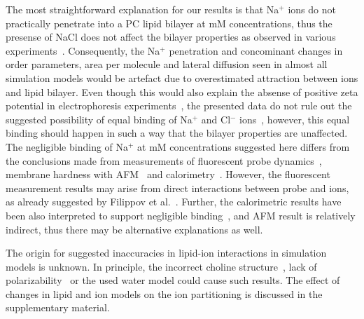 \documentclass[pre,aps,floatfix,authordate1-4,twocolumn]{revtex4-1}
\begin{document}
The most straightforward explanation for our results is that Na$^+$ ions do not practically penetrate into a PC lipid bilayer
at mM concentrations, thus the presense of NaCl does not affect the bilayer properties as observed in various 
experiments~\cite{akutsu81,altenbach84,clarke99,binder02,pabst07,filippov09}.
Consequently, the Na$^+$ penetration and concominant changes in order parameters, area per molecule and lateral diffusion 
seen in almost all simulation models would be artefact due to overestimated attraction between ions and lipid bilayer.
Even though this would also explain the absense of positive zeta potential in electrophoresis 
experiments~\cite{eisenberg79,tatulian87,manyes05,manyes06,klasczyk10},  
the presented data do not rule out the suggested possibility of equal binding of Na$^+$ and Cl$^-$ ions~\cite{knecht13},
however, this equal binding should happen in such a way that the bilayer properties are unaffected.
The negligible binding of Na$^+$ at mM concentrations suggested here differs from the conclusions made from 
measurements of fluorescent probe dynamics~\cite{bockmann03,vacha09a,harb13}, membrane hardness with 
AFM~\cite{manyes05,manyes06,fukuma07,ferber11,morata12} and calorimetry~\cite{bockmann03,klasczyk10}.
However, the fluorescent measurement results may arise from direct interactions between probe and ions, as already 
suggested by Filippov et al.~\cite{filippov09}. 
Further, the calorimetric results have been also interpreted to support negligible binding~\cite{cevc90}, 
and AFM result is relatively indirect, thus there may be alternative explanations as well.



The origin for suggested inaccuracies in lipid-ion interactions in simulation models is unknown. 
In principle, the incorrect choline structure~\cite{botan15}, lack of polarizability~\cite{leontyev11} or
the used water model could cause such results. The effect of changes in lipid and ion models on the ion
partitioning is discussed in the supplementary material.
\end{document}
